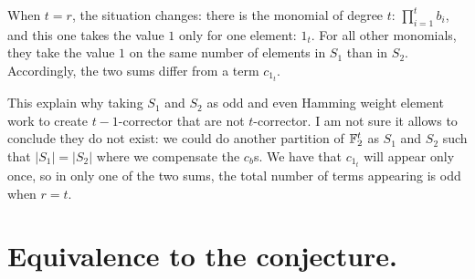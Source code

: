 \documentclass[11pt]{llncs}
\begin{document}
When $t=r$, the situation changes: there is the monomial of degree $t$: $\prod_{i=1}^t b_i$, and this one takes the value $1$ only for one element: $1_t$. For all other monomials, they take the value $1$ on the same number of elements in $S_1$ than in $S_2$.
Accordingly, the two sums differ from a term $c_{1_t}$.

This explain why taking $S_1$ and $S_2$ as odd and even Hamming weight element work to create $t-1$-corrector that are not $t$-corrector.
I am not sure it allows to conclude they do not exist: we could do another partition of $\mathbb{F}_2^t$ as $S_1$ and $S_2$ such that $|S_1|=|S_2|$ where we compensate the $c_b$s. We have that $c_{1_t}$ will appear only once, so in only one of the two sums, the total number of terms appearing is odd when $r=t$.

























\ifnum{}


\else


\fi

\appendix
{}
\section{Equivalence to the conjecture.}

\end{document}
